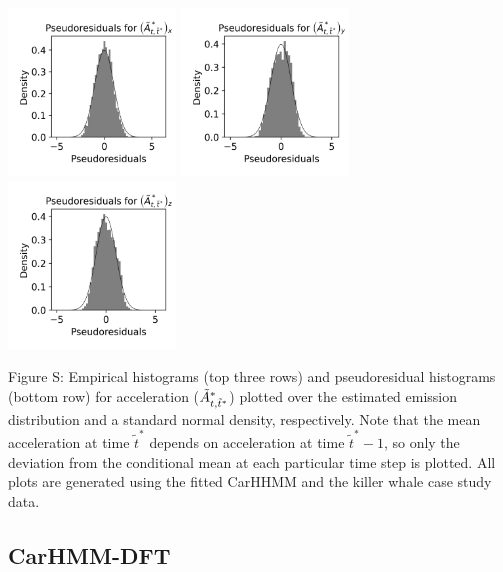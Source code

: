 \documentclass{article}
\begin{document}
\begin{center}
        \includegraphics[width=1.75in]{../Plots/2019/20190902-182840-CATs_OB_1_0_267_CarHHMM1_pseudresids_Ax.png}
        \includegraphics[width=1.75in]{../Plots/2019/20190902-182840-CATs_OB_1_0_267_CarHHMM1_pseudresids_Ay.png}
        \includegraphics[width=1.75in]{../Plots/2019/20190902-182840-CATs_OB_1_0_267_CarHHMM1_pseudresids_Az.png}
        \end{center}
        
        \noindent Figure S: Empirical histograms (top three rows) and pseudoresidual histograms (bottom row) for acceleration ($\tilde{A}^*_{t,\tilde t^*}$) plotted over the estimated emission distribution and a standard normal density, respectively. Note that the mean acceleration at time $\tilde t^*$ depends on acceleration at time $\tilde t^*-1$, so only the deviation from the conditional mean at each particular time step is plotted. All plots are generated using the fitted CarHHMM and the killer whale case study data.
        \addtocounter{fignum}{1}
        
        \newpage
        
        \subsection{CarHMM-DFT}
        
\end{document}
